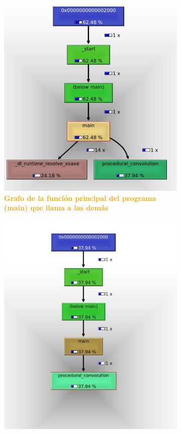 \documentclass{article}
\begin{document}
\begin{figure}[H]
  \begin{subfigure}[b]{0.44\textwidth}
    \includegraphics[width=\textwidth]{figures/main.jpg}
     \caption{\textbf{\textcolor{Orange}{Grafo de la función principal del programa (main) que llama a las demás}}}
  \end{subfigure}
  \begin{subfigure}[b]{0.43\textwidth}
    \includegraphics[width=\textwidth]{figures/profprocedural.jpg}

\end{subfigure}
\end{figure}
\end{document}
